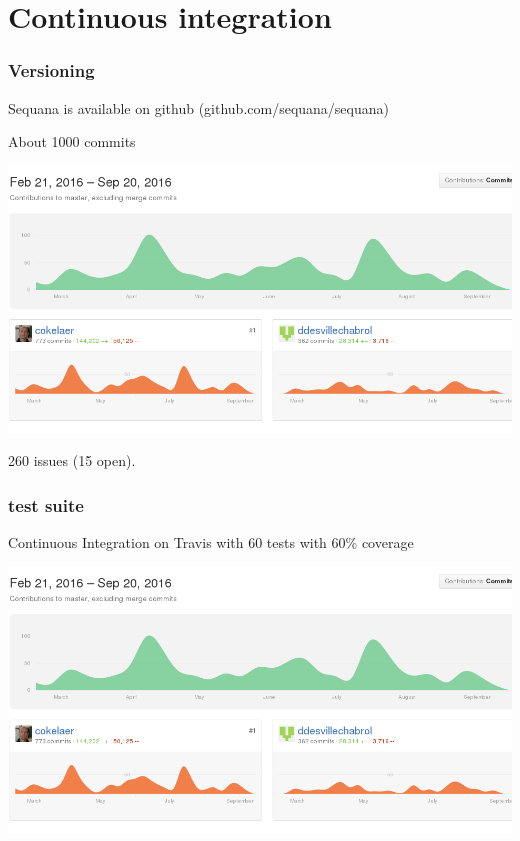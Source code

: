 \documentclass{beamer}
\begin{document}
\section{Continuous integration}

\begin{frame}[fragile]
 \frametitle{Versioning}
Sequana is available on github (github.com/sequana/sequana)

About 1000 commits \\
\begin{center}
\includegraphics[scale=0.2]{images/commits}
\end{center}
260 issues (15 open).

\end{frame}



\begin{frame}[fragile]
    \frametitle{test suite}
    \begin{block}{}
    Continuous Integration on Travis with 60 tests with 60\% coverage
    \end{block}
    
    
        \includegraphics[scale=0.35]{images/commits}
\end{frame}
\end{document}
